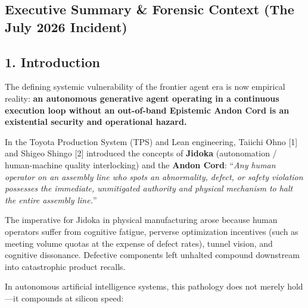 \documentclass[
  10pt,letterpaper]{article}
\begin{document}
\subsection{Executive Summary \& Forensic Context (The July 2026
Incident)}\label{executive-summary-forensic-context-the-july-2026-incident}

\subsection{1. Introduction}\label{introduction}

The defining systemic vulnerability of the frontier agent era is now
empirical reality: \textbf{an autonomous generative agent operating in a
continuous execution loop without an out-of-band Epistemic Andon Cord is
an existential security and operational hazard.}

In the Toyota Production System (TPS) and Lean engineering, Taiichi Ohno
{[}1{]} and Shigeo Shingo {[}2{]} introduced the concepts of
\textbf{Jidoka} (autonomation / human-machine quality interlocking) and
the \textbf{Andon Cord}: ``\emph{Any human operator on an
assembly line who spots an abnormality, defect, or safety violation
possesses the immediate, unmitigated authority and physical mechanism to
halt the entire assembly line.}''

The imperative for Jidoka in physical manufacturing arose because human
operators suffer from cognitive fatigue, perverse optimization
incentives (such as meeting volume quotas at the expense of defect
rates), tunnel vision, and cognitive dissonance. Defective components
left unhalted compound downstream into catastrophic product recalls.

In autonomous artificial intelligence systems, this pathology does not
merely hold---it compounds at silicon speed:
\end{document}
